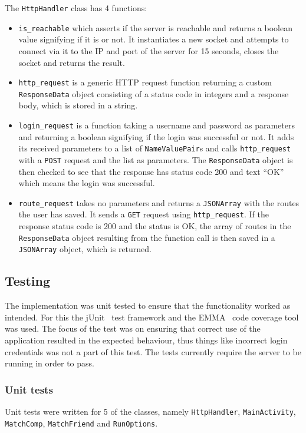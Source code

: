 The \texttt{HttpHandler} class has 4 functions: 
\begin{itemize}
	\item{\texttt{is\_reachable} which asserts if the server is reachable and returns a boolean value signifying if it is or not. It instantiates a new socket and attempts to connect via it to the IP and port of the server for 15 seconds, closes the socket and returns the result.}
	\item{\texttt{http\_request} is a generic \ac{HTTP} request function returning a custom \texttt{ResponseData} object consisting of a status code in integers and a response body, which is stored in a string.}
	\item{\texttt{login\_request} is a function taking a username and password as parameters and returning a boolean signifying if the login was successful or not. It adds its received parameters to a list of \texttt{NameValuePair}s and calls \texttt{http\_request} with a \texttt{POST} request and the list as parameters. The \texttt{ResponseData} object is then checked to see that the response has status code 200 and text ``OK'' which means the login was successful.}
	\item{\texttt{route\_request} takes no parameters and returns a \texttt{JSONArray} with the routes the user has saved. It sends a \texttt{GET} request using \texttt{http\_request}. If the response status code is 200 and the status is OK, the array of routes in the \texttt{ResponseData} object resulting from the function call is then saved in a \texttt{JSONArray} object, which is returned.}
\end{itemize}

\subsection{Testing}
The implementation was unit tested to ensure that the functionality worked as intended. For this the jUnit~\citep{junit} test framework and the EMMA~\citep{emma} code coverage tool was used. The focus of the test was on ensuring that correct use of the application resulted in the expected behaviour, thus things like incorrect login credentials was not a part of this test. The tests currently require the server to be running in order to pass.

\subsubsection{Unit tests}
Unit tests were written for 5 of the classes, namely \texttt{Http\-Handler}, \texttt{Main\-Activity}, \texttt{Match\-Comp}, \texttt{Match\-Friend} and \texttt{Run\-Options}. 

